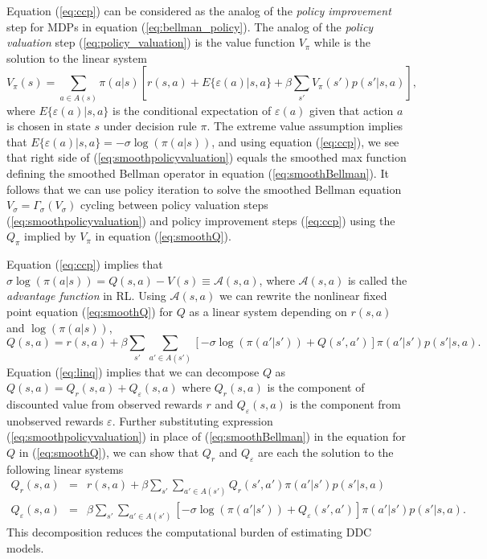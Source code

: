 Equation (\ref{eq:ccp}) can be considered as the analog of the {\it policy improvement\/} step for MDPs
in equation (\ref{eq:bellman_policy}).  The analog of the {\it policy valuation\/} step (\ref{eq:policy_valuation}) \citep{AguirregabiriaMira:2002} is 
the value function $V_\pi$  while is the solution to the linear system
\begin{equation}
   V_\pi(s) =\sum_{a \in A(s)} \pi(a|s)[r(s,a)+E\{\varepsilon(a)|s,a\}+\beta \sum_{s'} V_\pi(s')p(s'|s,a)],
\label{eq:smoothpolicyvaluation}
\end{equation}
where $E\{\varepsilon(a)|s,a\}$ is the conditional expectation of $\varepsilon(a)$ given that action $a$ is chosen
in state $s$  under decision rule $\pi$. The extreme value assumption implies that
$E\{\varepsilon(a)|s,a\}=-\sigma \log(\pi(a|s))$, and using equation (\ref{eq:ccp}), we see that right side of 
(\ref{eq:smoothpolicyvaluation}) equals the smoothed max function defining the smoothed Bellman operator in equation
(\ref{eq:smoothBellman}). It follows that we can use policy iteration to solve the smoothed Bellman equation $V_\sigma=\Gamma_\sigma(V_\sigma)$ 
cycling between policy valuation steps (\ref{eq:smoothpolicyvaluation})
and policy improvement steps (\ref{eq:ccp}) using the $Q_\pi$ implied by $V_\pi$ in equation (\ref{eq:smoothQ}).


Equation (\ref{eq:ccp}) implies that $\sigma\log(\pi(a|s))=Q(s,a)-V(s)\equiv \mathcal{A}(s,a)$, where
$\mathcal{A}(s,a)$ is called the {\it advantage function\/} in RL. Using $\mathcal{A}(s,a)$ we can rewrite the nonlinear fixed point
equation (\ref{eq:smoothQ}) for $Q$  as a linear system depending  on $r(s,a)$ and $\log(\pi(a|s))$,
\begin{equation}
    Q(s,a) = r(s,a) + \beta \sum_{s'} \sum_{a' \in A(s')} \left[ -\sigma\log(\pi(a'|s'))+Q(s',a')\right]\pi(a'|s')p(s'|s,a).
\label{eq:linq}
\end{equation}
Equation (\ref{eq:linq}) implies that we can decompose $Q$ as $Q(s,a)=Q_r(s,a)+Q_\varepsilon(s,a)$ where $Q_r(s,a)$ is the component 
of discounted value from observed rewards $r$ and $Q_\varepsilon(s,a)$ is the component from unobserved rewards $\varepsilon$.
Further substituting expression (\ref{eq:smoothpolicyvaluation}) in place of (\ref{eq:smoothBellman}) in the equation for
$Q$ in (\ref{eq:smoothQ}), we can show that $Q_r$ and $Q_\varepsilon$ are each the solution to the following linear systems
\begin{eqnarray}
     Q_r(s,a)&=&r(s,a)+\beta \sum_{s'} \sum_{a' \in A(s')} Q_r(s',a')\pi(a'|s')p(s'|s,a) \label{eq:Qr} \\
     Q_\varepsilon(s,a)&=&\beta \sum_{s'} \sum_{a' \in A(s')}\left[-\sigma\log(\pi(a'|s'))+ Q_\varepsilon(s',a')\right]\pi(a'|s')p(s'|s,a).
\label{eq:Qeps}
\end{eqnarray}
This decomposition reduces the computational burden of estimating DDC models.

